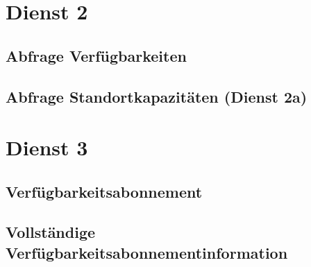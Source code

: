\section{Dienst 2}
\label{sec:Nachrichten:Dienst2}

\subsection*{Abfrage Verfügbarkeiten}
\label{subsec:Nachrichten:Dienst2:Availability}





\subsection*{Abfrage Standortkapazitäten (Dienst 2a)}
\label{subsec:Nachrichten:Dienst2:PlaceAvailability}





\section{Dienst 3}
\label{sec:Nachrichten:Dienst3}

\subsection*{Verfügbarkeitsabonnement}
\label{subsec:Nachrichten:Dienst3:AvailabilitySubscription}





% 

% 



\subsection*{Vollständige Verfügbarkeitsabonnementinformation}
\label{subsec:Nachrichten:Dienst3:CompleteAvailability}






